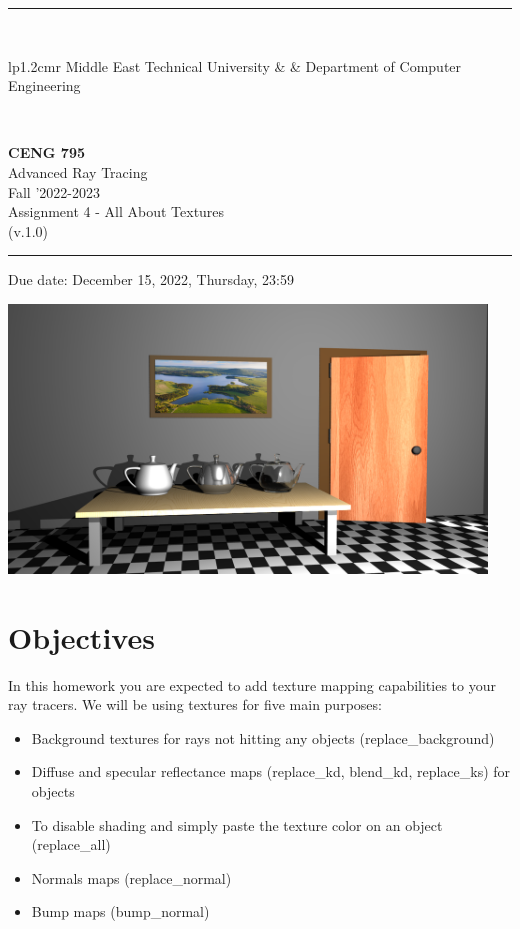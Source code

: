 \documentclass[12pt]{article}
\newcommand{\HRule}{\rule{\linewidth}{1mm}}
\begin{document}
\noindent \HRule \\[3mm]
\small
\begin{tabular}[b]{lp{1.2cm}r}
\href{https://www.metu.edu.tr/}{} Middle East Technical
University &  &
\href{https://ceng.metu.edu.tr/information}{} Department of Computer Engineering \\
\end{tabular} \\
\begin{center}

                 \LARGE \textbf{CENG 795} \\[4mm]
                 \Large Advanced Ray Tracing \\[4mm]
                \normalsize Fall '2022-2023 \\
                    \normalsize Assignment 4 - All About Textures \\
                    \normalsize (v.1.0)
\end{center}
\HRule

\begin{center}
Due date: December 15, 2022, Thursday, 23:59
\end{center}

\centerline{
    \includegraphics[width=5in]{../outputs/veach_ajar/VeachAjar.png}
}

\section{Objectives}

In this homework you are expected to add texture mapping capabilities to your ray
tracers. We will be using textures for five main purposes:

\begin{itemize}
    \item Background textures for rays not hitting any objects (replace\_background)
    \item Diffuse and specular reflectance maps (replace\_kd, blend\_kd, replace\_ks) for objects
    \item To disable shading and simply paste the texture color on an object (replace\_all)
    \item Normals maps (replace\_normal)
    \item Bump maps (bump\_normal)
\end{itemize}
\end{document}
